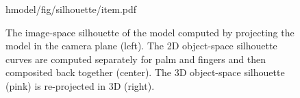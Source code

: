 \begin{figure}[t!]
\centering
\begin{overpic} 
[width=\linewidth]
{hmodel/fig/silhouette/item.pdf}
\end{overpic}
\caption{
% 
% 
The image-space silhouette of the model computed by projecting the model in the camera plane (left).
The 2D object-space silhouette curves are computed separately for palm and fingers and then composited back together (center).
The 3D object-space silhouette (pink) is re-projected in 3D (right).
% 
% 
} 
\label{fig:silhouette}
\end{figure}